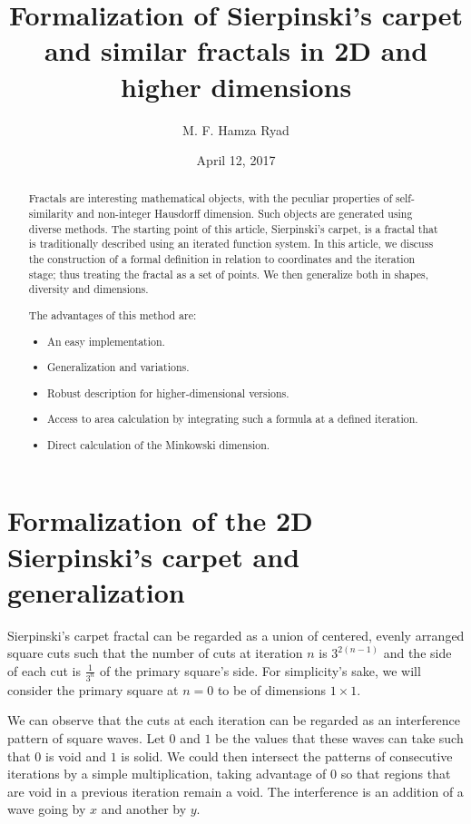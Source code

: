 \documentclass[11pt]{article}
\title{Formalization of Sierpinski's carpet and similar fractals in 2D and higher dimensions}
\author{M. F. Hamza Ryad}
\date{April 12, 2017}
\begin{document}
\maketitle

\begin{abstract}
Fractals are interesting mathematical objects, with the peculiar properties of self-similarity and non-integer Hausdorff dimension. Such objects are generated using diverse methods. The starting point of this article, Sierpinski's carpet, is a fractal that is traditionally described using an iterated function system. In this article, we discuss the construction of a formal definition in relation to coordinates and the iteration stage; thus treating the fractal as a set of points. We then generalize both in shapes, diversity and dimensions.

The advantages of this method are:
\begin{itemize}
  \item An easy implementation.
  \item Generalization and variations.
  \item Robust description for higher-dimensional versions.
  \item Access to area calculation by integrating such a formula at a defined iteration.
  \item Direct calculation of the Minkowski dimension.
\end{itemize}
\end{abstract}

\tableofcontents

\section{Formalization of the 2D Sierpinski's carpet and generalization}

Sierpinski's carpet fractal can be regarded as a union of centered, evenly arranged square cuts such that the number of cuts at iteration $n$ is $3^{2(n-1)}$ and the side of each cut is $\frac{1}{3^n}$ of the primary square's side. For simplicity's sake, we will consider the primary square at $n=0$ to be of dimensions $1\times 1$.

We can observe that the cuts at each iteration can be regarded as an interference pattern of square waves. Let $0$ and $1$ be the values that these waves can take such that $0$ is void and $1$ is solid.
We could then intersect the patterns of consecutive iterations by a simple multiplication, taking advantage of $0$ so that regions that are void in a previous iteration remain a void. The interference is an addition of a wave going by $x$ and another by $y$.
\end{document}
